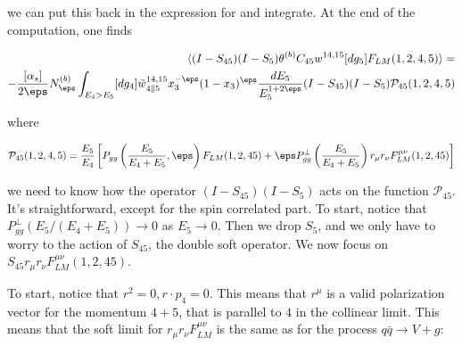 \documentclass[11pt]{report}
\begin{document}
we can put this back in the expression for  and integrate. At the end of the computation, one finds 

\begin{align}
    \braket{(I-S_{45})(I-S_5)\theta^{(b)}C_{45}w^{14, 15}[dg_5]F_{LM}(1, 2, 4, 5)} =  \\ 
    -\frac{[\alpha_s]}{2\eps}N_{\eps}^{(b)}\int_{E_4 > E_5} [dg_4] \tilde{w}^{14, 15}_{4 \parallel 5} x_3^{-\eps}(1-x_3)^\eps \frac{dE_5}{E_5^{1+2\eps}}(I-S_{45})(I-S_5)\mathcal{P}_{45}(1,2,4,5)
\end{align}

where 

\begin{align}
    \mathcal{P}_{45}(1, 2, 4, 5) = \frac{E_5}{E_4}\left[ P_{gg}\left( \frac{E_5}{E_4 + E_5}, \eps \right)F_{LM}(1, 2, 45) + \eps P_{gg}^{\perp} \left( \frac{E_5}{E_4 + E_5}\right)r_\mu r_\nu F_{LM}^{\mu\nu}(1, 2, 45)  \right]
\end{align}

we need to know how the operator \((I-S_{45})(I-S_5)\) acts on the function \(\mathcal{P}_{45}\). It's straightforward, except for the spin correlated part. To start, notice that \(P^\perp_{gg}(E_5/(E_4+E_5)) \to 0\) as \(E_5 \to 0\). Then we drop \(S_5\), and we only have to worry to the action of \(S_{45}\), the double soft operator. We now focus on \(S_{45}r_\mu r_\nu F_{LM}^{\mu\nu}(1, 2, 45)\). 

To start, notice that \(r^2 = 0, r\cdot p_4 =0\). This means that \(r^\mu\) is a valid polarization vector for the momentum \(4+5\), that is parallel to \(4\) in the collinear limit. This means that the soft limit for \(r_\mu r_\nu F_{LM}^{\mu\nu}\) is the same as for the process \(q\bar{q} \to V +g\): 
\end{document}
